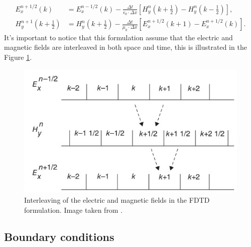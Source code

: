 \documentclass[12pt, oneside]{book}
\begin{document}
\begin{align}
    E_{x}^{n+1 / 2}(k) &=E_{x}^{n-1 / 2}(k)-\frac{\Delta t}{\epsilon_{0} \cdot \Delta x}\left[H_{y}^{n}\left(k+\frac{1}{2}\right)-H_{y}^{n}\left(k-\frac{1}{2}\right)\right], \\
    H_{y}^{n+1}\left(k+\frac{1}{2}\right) &=H_{y}^{n}\left(k+\frac{1}{2}\right)-\frac{\Delta t}{\mu_{0} \cdot \Delta x}\left[E_{x}^{n+1 / 2}(k+1)-E_{x}^{n+1 / 2}(k)\right].
\end{align}
It's important to notice that this formulation assume that the electric and magnetic fields are interleaved in both space and time, this is illustrated in the Figure \ref{fig:sullivaninterleaved}.
\begin{figure}[H]
    \centering
    \includegraphics[scale=0.8]{Imagenes/Sullivan_interleaved.jpg}
    \caption{Interleaving of the electric and magnetic fields in the FDTD formulation. Image taken from \cite{Sullivan2020}.}
    \label{fig:sullivaninterleaved}
\end{figure}
\subsection{Boundary conditions}
\end{document}
